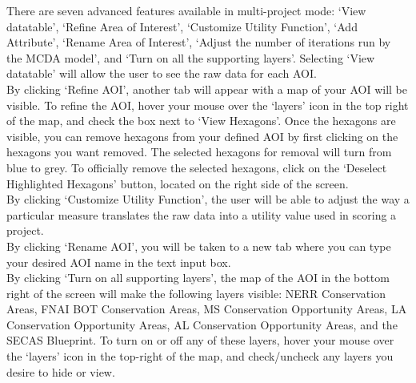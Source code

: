 \documentclass[
]{book}
\begin{document}
There are seven advanced features available in multi-project mode: `View datatable', `Refine Area of Interest', `Customize Utility Function', `Add Attribute', `Rename Area of Interest', `Adjust the number of iterations run by the MCDA model', and `Turn on all the supporting layers'.
Selecting `View datatable' will allow the user to see the raw data for each AOI.\\
By clicking `Refine AOI', another tab will appear with a map of your AOI will be visible. To refine the AOI, hover your mouse over the `layers' icon in the top right of the map, and check the box next to `View Hexagons'. Once the hexagons are visible, you can remove hexagons from your defined AOI by first clicking on the hexagons you want removed. The selected hexagons for removal will turn from blue to grey. To officially remove the selected hexagons, click on the `Deselect Highlighted Hexagons' button, located on the right side of the screen.\\
By clicking `Customize Utility Function', the user will be able to adjust the way a particular measure translates the raw data into a utility value used in scoring a project.\\
By clicking `Rename AOI', you will be taken to a new tab where you can type your desired AOI name in the text input box.\\
By clicking `Turn on all supporting layers', the map of the AOI in the bottom right of the screen will make the following layers visible: NERR Conservation Areas, FNAI BOT Conservation Areas, MS Conservation Opportunity Areas, LA Conservation Opportunity Areas, AL Conservation Opportunity Areas, and the SECAS Blueprint. To turn on or off any of these layers, hover your mouse over the `layers' icon in the top-right of the map, and check/uncheck any layers you desire to hide or view.

  
\end{document}
